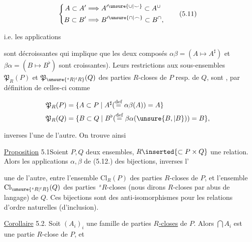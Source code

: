 \[
\left\{\begin{aligned}
 A\subset A'&\Longrightarrow A'^{\unsure{\cup|\smile}}\subset A^\cup\\
 B\subset B'&\Longrightarrow B'^{\unsure{\cap|\frown}}\subset B^\cap,
\end{aligned}\right.
\tag*{(5.11)}
\]

i.e. les applications


sont décroissantes  qui implique que les deux composés $\alpha\beta=(A\mapsto A^\sharp)$ et $\beta\alpha=(B\mapsto B^\flat)$ sont croissantes). Leurs restrictions aux sous-ensembles $\mathfrak P_R(P)$ et $\mathfrak P_{\unsure{{}^{s}R|{}^{t}R}}(Q)$ des parties $R$-closes de $P$ resp. de $Q$, sont , par définition de celles-ci comme

\[
\begin{aligned}
 \mathfrak P_R(P)&=\{A\subset P\mid A^\sharp(\overset{\mathrm{def}}{=}\alpha\beta(A))=A\}\\
 \mathfrak P_R(Q)&=\{B\subset Q\mid B^\flat(\overset{\mathrm{def}}{=}\beta\alpha(\unsure{B,|B}))=B\},
\end{aligned}
\]

inverses l'une de l'autre. On trouve ainsi

\uline{Proposition} 5.1\quad Soient $P,Q$ deux ensembles, $R\inserted{\subset P\times Q}$ une relation. Alors les applications $\alpha,\beta$ de (5.12.)  des bijections, inverses l' 

une de l'autre, entre l'ensemble $\mathrm{Cl}_R(P)$ des parties $R$-closes de $P$, et l'ensemble $\mathrm{Cl}_{\unsure{{}^{s}R|{}^{t}R}}(Q)$ des parties $\,{}^{s}R$-closes (nous dirons $R$-closes par abus de langage) de $Q$. Ces bijections sont  des anti-isomorphismes pour les relations d'ordre naturelles (d'inclusion).

\margin{\rule{0.4pt}{4\baselineskip}}%
\uline{Corollaire} 5.2. Soit $(A_i)_i$ une famille de parties \uline{$R$-closes} de $P$. Alors $\bigcap A_i$ est une partie $R$-close de $P$, et

